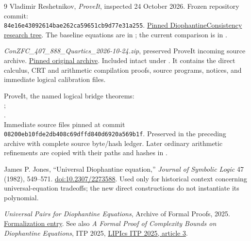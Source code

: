 \begin{thebibliography}{9}
Vladimir Reshetnikov, \emph{ProveIt}, inspected 24 October 2026. Frozen repository commit:\\
{\small\texttt{84e16e43092614bae262ca59651cb9d77e31a255}}.
\href{https://github.com/VladimirReshetnikov/ProveIt/tree/84e16e43092614bae262ca59651cb9d77e31a255/Computability/DiophantineConsistency}{Pinned DiophantineConsistency research tree}.
The baseline equations are in ; the current comparison is in .

\emph{ConZFC\_407\_888\_Quartics\_2026-10-24.zip}, preserved ProveIt incoming source archive.
\href{https://github.com/VladimirReshetnikov/ProveIt/blob/84e16e43092614bae262ca59651cb9d77e31a255/docs/incoming/ConZFC_407_888_Quartics_2026-10-24.zip}{Pinned original archive}.
Included intact under . It contains the direct calculus, CRT and arithmetic compilation proofs, source programs, notices, and immediate logical calibration files.

ProveIt, the named logical bridge theorems:\\
{\small{}};\\
{\small{}}.\\
Immediate source files pinned at commit\\
{\small\texttt{08200eb10fde2db408c69dffd840d6920a569b1f}}.
Preserved in the preceding archive with complete source byte/hash ledger. Later ordinary arithmetic refinements are copied with their paths and hashes in .

James P. Jones, ``Universal Diophantine equation,'' \emph{Journal of Symbolic Logic} 47 (1982), 549--571.
\href{https://doi.org/10.2307/2273588}{doi:10.2307/2273588}.
Used only for historical context concerning universal-equation tradeoffs; the new direct constructions do not instantiate its polynomial.

\emph{Universal Pairs for Diophantine Equations}, Archive of Formal Proofs, 2025.
\href{https://isa-afp.org/entries/Diophantine_Universal_Pairs.html}{Formalization entry}.
See also \emph{A Formal Proof of Complexity Bounds on Diophantine Equations}, ITP 2025,
\href{https://drops.dagstuhl.de/storage/00lipics/lipics-vol352-itp2025/LIPIcs.ITP.2025.3/LIPIcs.ITP.2025.3.pdf}{LIPIcs ITP 2025, article 3}.
\end{thebibliography}
